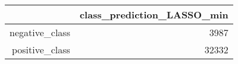 \begin{table}[ht]
\centering
\begin{tabular}{rr}
  \hline
 & class\_prediction\_LASSO\_min \\ 
  \hline
negative\_class & 3987 \\ 
  positive\_class & 32332 \\ 
   \hline
\end{tabular}
\end{table}
